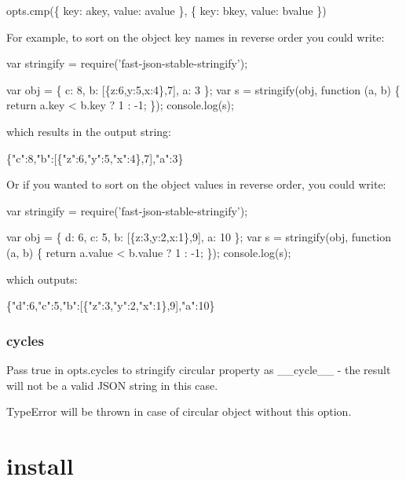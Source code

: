 \begin{DoxyCode}
opts.cmp(\{ key: akey, value: avalue \}, \{ key: bkey, value: bvalue \})
\end{DoxyCode}


For example, to sort on the object key names in reverse order you could write\+:


\begin{DoxyCode}
var stringify = require('fast-json-stable-stringify');

var obj = \{ c: 8, b: [\{z:6,y:5,x:4\},7], a: 3 \};
var s = stringify(obj, function (a, b) \{
    return a.key < b.key ? 1 : -1;
\});
console.log(s);
\end{DoxyCode}


which results in the output string\+:


\begin{DoxyCode}
\{"c":8,"b":[\{"z":6,"y":5,"x":4\},7],"a":3\}
\end{DoxyCode}


Or if you wanted to sort on the object values in reverse order, you could write\+:


\begin{DoxyCode}
var stringify = require('fast-json-stable-stringify');

var obj = \{ d: 6, c: 5, b: [\{z:3,y:2,x:1\},9], a: 10 \};
var s = stringify(obj, function (a, b) \{
    return a.value < b.value ? 1 : -1;
\});
console.log(s);
\end{DoxyCode}


which outputs\+:


\begin{DoxyCode}
\{"d":6,"c":5,"b":[\{"z":3,"y":2,"x":1\},9],"a":10\}
\end{DoxyCode}


\subsubsection*{cycles}

Pass {\ttfamily true} in {\ttfamily opts.\+cycles} to stringify circular property as {\ttfamily \+\_\+\+\_\+cycle\+\_\+\+\_\+} -\/ the result will not be a valid J\+S\+ON string in this case.

Type\+Error will be thrown in case of circular object without this option.

\section*{install}

